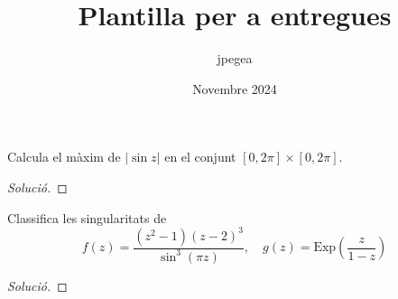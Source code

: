 \documentclass{article}
\title{Plantilla per a entregues}
\author{jpegea}
\date{Novembre 2024}
\renewcommand\exp{\mathrm{Exp}}
\begin{document}
\maketitle

\begin{probapartat}
  Calcula el màxim de $\left|\sin z \right|$ en el conjunt
  $[0, 2\pi] \times [0, 2\pi]$.
\end{probapartat}

\begin{proof}[Solució]
\end{proof}

\begin{apartat}
  Classifica les singularitats de
  \begin{equation*}
    f(z) =
    \frac{(z^2-1)(z-2)^3}{\sin^3(\pi z)}, \quad
    g(z) =
    \exp\left( \frac{z}{1-z} \right)
  \end{equation*}
\end{apartat}

\begin{proof}[Solució]
\end{proof}
\end{document}
